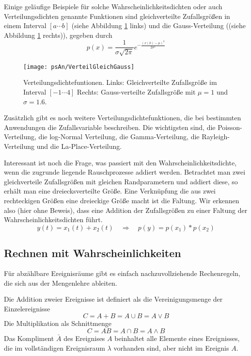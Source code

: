Einige geläufige Beispiele für solche Wahrscheinlichkeitsdichten
oder auch Verteilungsdichten genannte Funktionen sind
gleichverteilte Zufallsgrößen in einem Interval $[a \cdots b]$
(siehe Abbildung \ref{Anh:pic:Verteilungen} links) und die
Gauss-Verteilung ((siehe Abbildung \ref{Anh:pic:Verteilungen}
rechts)), gegeben durch
\begin{equation}
    p(x) = \frac{1}{\sigma \sqrt{2\pi}} e^{-\frac{(x(k)-\mu)^2}{2\sigma^2}}
\end{equation}

\begin{figure}[H]
\begin{center}
\texttt{[image: psAn/VerteilGleichGauss]}
\caption{\label{Anh:pic:Verteilungen}Verteilungsdichtefuntionen.
Links: Gleichverteilte Zufallsgröße im Interval $[-1 \cdots 4]$
Rechts: Gauss-verteilte Zufallsgröße mit $\mu = 1$ und $\sigma =
1.6$.}
\end{center}
\end{figure}

Zusätzlich gibt es noch weitere Verteilungsdichtefunktionen, die
bei bestimmten Anwendungen die Zufallsvariable beschreiben. Die
wichtigsten sind, die Poisson-Verteilung, die log-Normal
Verteilung, die Gamma-Verteilung, die Rayleigh-Verteilung und die
La-Place-Verteilung.

Interessant ist noch die Frage, was passiert mit den
Wahrscheinlichkeitsdichte, wenn die zugrunde liegende
Rauschprozesse addiert werden. Betrachtet man zwei gleichverteile
Zufallsgrößen mit gleichen Randparametern und addiert diese, so
erhält man eine dreiecksverteilte Größe. Eine Verknüpfung die aus
zwei rechteckigen Größen eine dreieckige Größe macht ist die
Faltung. Wir erkennen also (hier ohne Beweis), dass eine Addition
der Zufallsgrößen zu einer Faltung der Wahrscheinlichkeitsdichten
führt.
\begin{equation}\label{eq:DefZusammenhangAddundFaltung}
    y(t) = x_1(t) + x_2(t) \quad \Rightarrow \quad p(y) = p(x_1)
    \ast p(x_2)
\end{equation}

\subsection{Rechnen mit Wahrscheinlichkeiten}
Für abzählbare Ereignisräume gibt es einfach nachzuvollziehende
Rechenregeln, die sich aus der Mengenlehre ableiten.

Die Addition zweier Ereignisse ist definiert als die
Vereinigungsmenge der Einzelereignisse
\begin{equation}\label{eq:Def:AddWahrscheinlichkeiten}
    C = A + B = A \cup B = A \vee B
\end{equation}
Die Multiplikation als Schnittmenge
\begin{equation}\label{eq:Def:MultWahrscheinlichkeiten}
    C = A B = A \cap B = A \wedge B
\end{equation}
Das Kompliment $\bar{A}$ des Ereignises $A$ beinhaltet alle
Elemente eines Ereignisses, die im vollständigen Ereignisraum
$\lambda$ vorhanden sind, aber nicht im Ereignis $A$.

